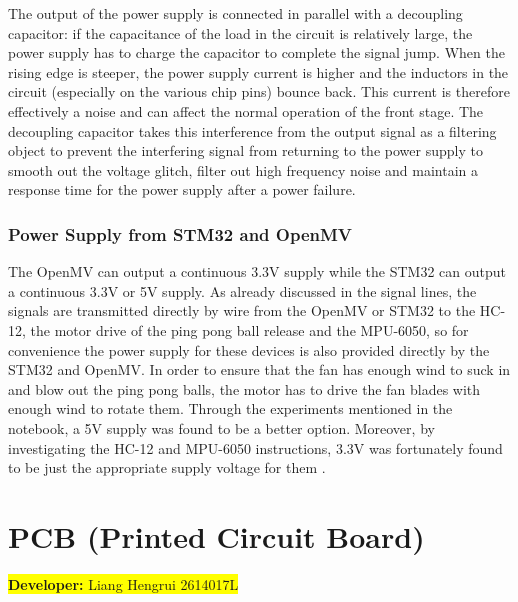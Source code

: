 \documentclass[12pt, a4paper, oneside]{report}
\begin{document}
The output of the power supply is connected in parallel with a decoupling capacitor: if the capacitance of the load in the circuit is relatively large, the power supply has to charge the capacitor to complete the signal jump. When the rising edge is steeper, the power supply current is higher and the inductors in the circuit (especially on the various chip pins) bounce back. This current is therefore effectively a noise and can affect the normal operation of the front stage. The decoupling capacitor takes this interference from the output signal as a filtering object to prevent the interfering signal from returning to the power supply to smooth out the voltage glitch, filter out high frequency noise and maintain a response time for the power supply after a power failure.

\subsubsection{Power Supply from STM32 and OpenMV}
The OpenMV can output a continuous 3.3V supply while the STM32 can output a continuous 3.3V or 5V supply. As already discussed in the signal lines, the signals are transmitted directly by wire from the OpenMV or STM32 to the HC-12, the motor drive of the ping pong ball release and the MPU-6050, so for convenience the power supply for these devices is also provided directly by the STM32 and OpenMV. In order to ensure that the fan has enough wind to suck in and blow out the ping pong balls, the motor has to drive the fan blades with enough wind to rotate them. Through the experiments mentioned in the notebook, a 5V supply was found to be a better option. Moreover, by investigating the HC-12 and MPU-6050 instructions, 3.3V was fortunately found to be just the appropriate supply voltage for them \cite{zzs2}.
    

    
\newpage
\section{PCB (Printed Circuit Board)}\label{sec:PCB}
\colorbox{yellow}{\textbf{Developer:} Liang Hengrui 2614017L}
\end{document}
